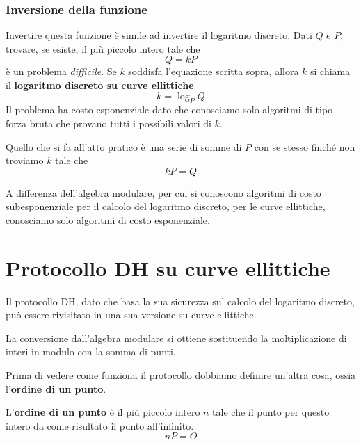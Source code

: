 \subsubsection{Inversione della funzione}
Invertire questa funzione \`e simile ad invertire il logaritmo discreto. Dati $Q$ e $P$, trovare, se esiste, il
pi\`u piccolo intero tale che
\[ Q = kP \]
\`e un problema \emph{difficile}. Se $k$ soddisfa l'equazione scritta sopra, allora $k$ si chiama il
\textbf{logaritmo discreto su curve ellittiche}
\[ k = \log_P Q \]
Il problema ha costo esponenziale dato che conosciamo solo algoritmi di tipo forza bruta che provano tutti i
possibili valori di $k$.

Quello che si fa all'atto pratico \`e una serie di somme di $P$ con se stesso finch\'e non troviamo $k$ tale che
\[ kP = Q \]

A differenza dell'algebra modulare, per cui si conoscono algoritmi di costo subesponenziale per il calcolo del
logaritmo discreto, per le curve ellittiche, conosciamo solo algoritmi di costo esponenziale.

\section{Protocollo DH su curve ellittiche}
Il protocollo DH, dato che basa la sua sicurezza sul calcolo del logaritmo discreto, pu\`o essere rivisitato in
una sua versione su curve ellittiche.

La conversione dall'algebra modulare si ottiene sostituendo la moltiplicazione di interi in modulo con la somma di
punti.

Prima di vedere come funziona il protocollo dobbiamo definire un'altra cosa, ossia l'\textbf{ordine di un punto}.

\begin{definition}
	L'\textbf{ordine di un punto} \`e il pi\`u piccolo intero $n$ tale che il punto per questo intero da come risultato
	il punto all'infinito.
	\[ nP = O \]
\end{definition}

